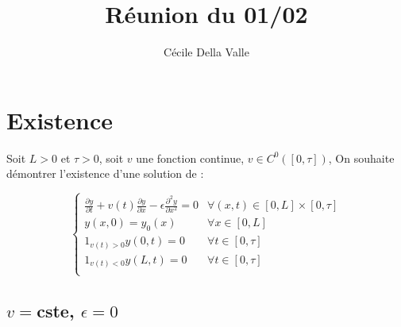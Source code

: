 \documentclass[a4paper]{article}
\title{Réunion du 01/02}
\author{Cécile Della Valle}
\begin{document}
\maketitle

\section{Existence}

Soit $L>0$ et $\tau>0$,
soit $v$ une fonction continue, $v \in C^0([0,\tau])$, 
On souhaite démontrer l'existence d'une solution de :

\begin{equation}
\label{eq:general}
\begin{cases}
 \displaystyle \frac{\partial y}{\partial t}
 + v(t) \frac{\partial y} {\partial x}  
 - \epsilon \frac{\partial^2 y} {\partial x^2}
 = 0  & \forall (x,t) \in [0,L] \times [0, \tau]\\
 y(x,0) = y_{0} (x) & \forall x \in [0,L] \\
 1_{v(t)>0}y(0,t) = 0 & \forall t \in [0,\tau] \\
 1_{v(t)<0}y(L,t) = 0 & \forall t \in [0,\tau] \\
\end{cases}
\end{equation}


\subsection{$v=$cste, $\epsilon = 0$}
\end{document}
